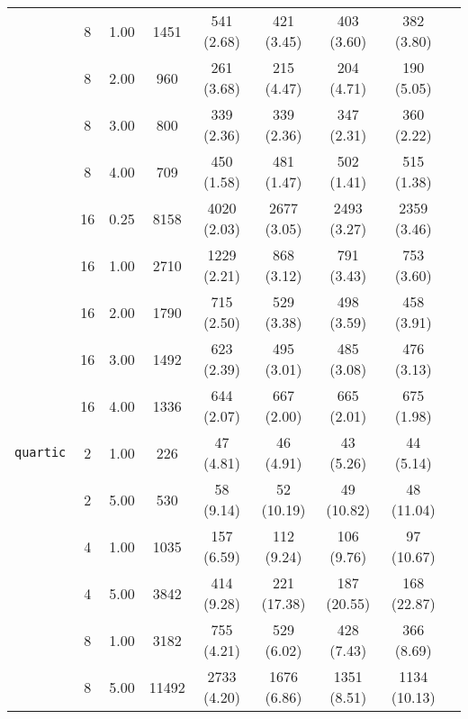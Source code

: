 \begin{table*}
\begin{tabular}{ l*{8}{c}}
&    8 &    1.00 &    1451 &    541 (2.68) & 421 (3.45) & 403 (3.60) & 382 (3.80) \\ 
    
&    8 &    2.00 &    960 &    261 (3.68) & 215 (4.47) & 204 (4.71) & 190 (5.05) \\ 
    
&    8 &    3.00 &    800 &    339 (2.36) & 339 (2.36) & 347 (2.31) & 360 (2.22) \\ 
    
&    8 &    4.00 &    709 &    450 (1.58) & 481 (1.47) & 502 (1.41) & 515 (1.38) \\ 
    
&    16 &    0.25 &    8158 &    4020 (2.03) & 2677 (3.05) & 2493 (3.27) & 2359 (3.46) \\ 
    
&    16 &    1.00 &    2710 &    1229 (2.21) & 868 (3.12) & 791 (3.43) & 753 (3.60) \\ 
    
&    16 &    2.00 &    1790 &    715 (2.50) & 529 (3.38) & 498 (3.59) & 458 (3.91) \\ 
    
&    16 &    3.00 &    1492 &    623 (2.39) & 495 (3.01) & 485 (3.08) & 476 (3.13) \\ 
    
&    16 &    4.00 &    1336 &    644 (2.07) & 667 (2.00) & 665 (2.01) & 675 (1.98) \\ 
    
\toprule  %

\texttt{quartic} 
&    2 &    1.00 &    226 &    47 (4.81) & 46 (4.91) & 43 (5.26) & 44 (5.14) \\ 
    
&    2 &    5.00 &    530 &    58 (9.14) & 52 (10.19) & 49 (10.82) & 48 (11.04) \\ 
    
&    4 &    1.00 &    1035 &    157 (6.59) & 112 (9.24) & 106 (9.76) & 97 (10.67) \\ 
    
&    4 &    5.00 &    3842 &    414 (9.28) & 221 (17.38) & 187 (20.55) & 168 (22.87) \\ 
    
&    8 &    1.00 &    3182 &    755 (4.21) & 529 (6.02) & 428 (7.43) & 366 (8.69) \\ 
    
&    8 &    5.00 &    11492 &    2733 (4.20) & 1676 (6.86) & 1351 (8.51) & 1134 (10.13) \\ 
    

\end{tabular}
\end{table*}
